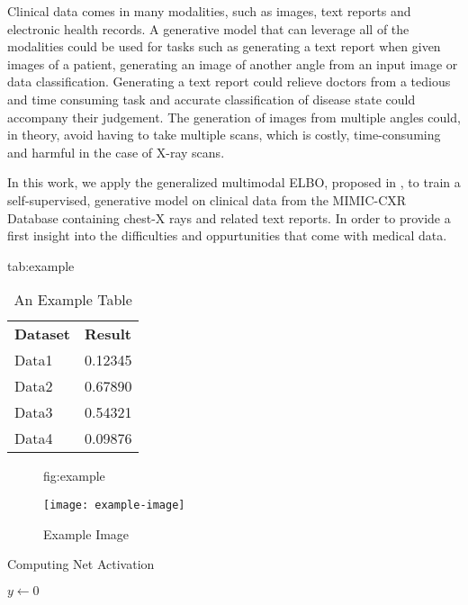 \documentclass{midl} %
\begin{document}
	Clinical data comes in many modalities, such as images, text reports and electronic health records.
	A generative model that can leverage all of the modalities could be used for tasks such as generating a text report when given images of a patient, generating an image of another angle from an input image or data classification.
	Generating a text report could relieve doctors from a tedious and time consuming task and accurate classification of disease state could accompany their judgement.
	The generation of images from multiple angles could, in theory, avoid having to take multiple scans, which is costly, time-consuming and harmful in the case of X-ray scans.

	In this work, we apply the generalized multimodal ELBO, proposed in \cite{thomas_gener-ELBO}, to train a self-supervised, generative model on clinical data from the MIMIC-CXR Database \cite{johnson2019mimic} containing chest-X rays and related text reports. In order to provide a first insight into the difficulties and oppurtunities that come with medical data.

\begin{table}[htbp]
\floatconts
  {tab:example}%
  {\caption{An Example Table}}%
  {\begin{tabular}{ll}
  \bfseries Dataset & \bfseries Result\\
  Data1 & 0.12345\\
  Data2 & 0.67890\\
  Data3 & 0.54321\\
  Data4 & 0.09876
  \end{tabular}}
\end{table}

\begin{figure}[htbp]
\floatconts
  {fig:example}
  {\caption{Example Image}}
  {\texttt{[image: example-image]}}
\end{figure}

\begin{algorithm2e}
\caption{Computing Net Activation}
\label{alg:net}
{}
$y\leftarrow 0$\;
\end{algorithm2e}
\end{document}

